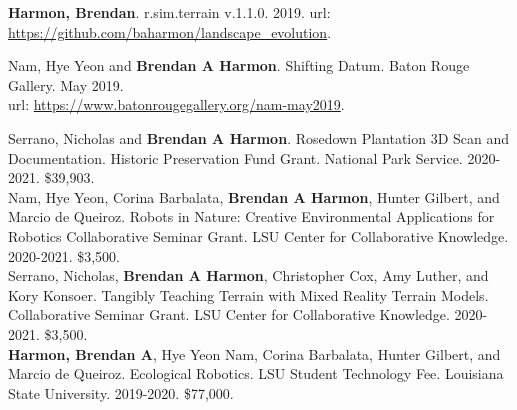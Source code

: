 \documentclass[10pt]{developercv} %
\begin{document}
\printbibliography[title={\cvsect{Reports}},type=report, heading=subbibliography]



\textbf{Harmon, Brendan}. r.sim.terrain v.1.1.0. 2019. url: \url{https://github.com/baharmon/landscape_evolution}.



Nam, Hye Yeon and \textbf{Brendan A Harmon}. Shifting Datum. Baton Rouge Gallery. May 2019.\\
url: \url{https://www.batonrougegallery.org/nam-may2019}.

\clearpage



Serrano, Nicholas and \textbf{Brendan A Harmon}. 
Rosedown Plantation 3D Scan and Documentation. 
Historic Preservation Fund Grant. National Park Service. 
2020-2021. \$39,903.\\

Nam, Hye Yeon, Corina Barbalata, \textbf{Brendan A Harmon}, Hunter Gilbert, and Marcio de Queiroz.
Robots in Nature: Creative Environmental Applications for Robotics
Collaborative Seminar Grant. LSU Center for Collaborative Knowledge.
2020-2021. \$3,500.\\

Serrano, Nicholas, \textbf{Brendan A Harmon}, Christopher Cox, Amy Luther, and Kory Konsoer.
Tangibly Teaching Terrain with Mixed Reality Terrain Models.
Collaborative Seminar Grant. LSU Center for Collaborative Knowledge.
2020-2021. \$3,500.\\

\textbf{Harmon, Brendan A}, Hye Yeon Nam, Corina Barbalata, Hunter Gilbert, and Marcio de Queiroz.
Ecological Robotics.
LSU Student Technology Fee. Louisiana State University. 
2019-2020.	\$77,000.\\
\end{document}
